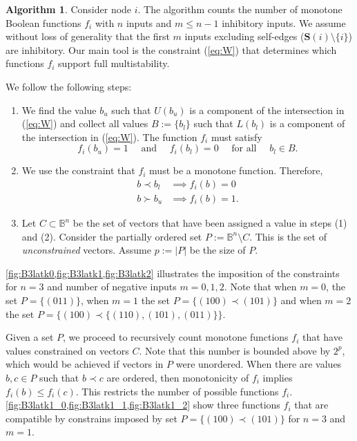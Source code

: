 \documentclass[12pt]{amsart}
\newcommand{\bbB}{\mathbb{B}}
\newcommand{\Sources}{\mathbf{S}}
\theoremstyle{definition}
\newtheorem{algorithm}[thm]{Algorithm}
\begin{document}
\begin{algorithm}
Consider node $i$.
The algorithm counts the number of monotone Boolean functions $f_i$ with $n$ inputs and $m\leq n-1$ inhibitory inputs. We
assume without loss of generality that the first $m$ inputs excluding self-edges ($\Sources(i) \setminus \{i\}$) are inhibitory.
Our main tool is the constraint (\ref{eq:W}) that determines which functions $f_i$ support full multistability.

We follow the following steps:
 \begin{enumerate}
        \item We find the value $b_u$ such that $U(b_u)$ is a component of the intersection in (\ref{eq:W}) and collect all values $B:=\{b_l\}$ such that $L(b_l)$ is a component of the intersection in  (\ref{eq:W}). The function $f_i$ must satisfy 
        \[ f_i(b_u) =1 \quad \mbox{ and } \quad f_i(b_l) =0 \quad \mbox{ for all } \quad b_l\in B.\]
        \item We use the constraint that $f_i$ must be a monotone function. Therefore, 
        \begin{align*}
        b\prec b_l & \implies f_i(b) = 0 \\
        b\succ b_u &\implies f_i(b) = 1.
        \end{align*}
        \item Let $C \subset \bbB^n$ be the set of vectors that have been assigned a value in steps (1) and (2). Consider the partially ordered set $P:=\bbB^n \setminus C$. This is the set of \textit{unconstrained} vectors. Assume 
        $p:=|P|$ be the size of $P$.
    \end{enumerate}
    \cref{fig:B3latk0,fig:B3latk1,fig:B3latk2} illustrates the imposition of the constraints for $n=3$ and number of negative inputs $m=0,1,2$. Note that when $m=0$, the set $P=\{(011)\}$, when $m=1$ the set $P=\{(100) \prec (101)\}$ and when $m=2$ the set $P=\{(100) \prec\{ (110),(101),(011)\}\}$.
    
    Given a set $P$, we proceed to recursively count monotone functions $f_i$ that have values constrained on vectors $C$. Note that this number is bounded above by $2^p$, which would be achieved if vectors in $P$ were unordered. When there are values $b,c \in P$ such that $b \prec c$ are ordered, then monotonicity of $f_i$ implies $f_i(b) \leq f_i(c)$. This restricts the number of possible functions $f_i$. \cref{fig:B3latk1_0,fig:B3latk1_1,fig:B3latk1_2} show three functions $f_i$ that are compatible by constrains imposed by set $P=\{(100) \prec (101)\}$ for $n=3$ and $m=1.$


\end{algorithm}
\end{document}
